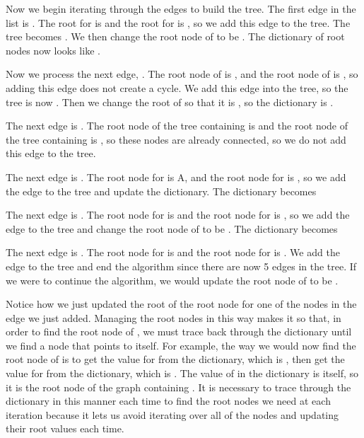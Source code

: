 Now we begin iterating through the edges to build the tree.
The first edge in the list is .
The root for  is  and the root for  is , so we add this edge to the tree.
The tree becomes \li{[(C, D, 1)]}.
We then change the root node of  to be .
The dictionary of root nodes now looks like .

Now we process the next edge, .
The root node of  is , and the root node of  is , so adding this edge does not create a cycle.
We add this edge into the tree, so the tree is now \li{[(C, D, 1), (C, E, 1)]}.
Then we change the root of  so that it is , so the dictionary is .

The next edge is .
The root node of the tree containing  is  and the root node of the tree containing  is , so these nodes are already connected, so we do not add this edge to the tree.

The next edge is .
The root node for  is A, and the root node for  is , so we add the edge to the tree and update the dictionary.
The dictionary becomes 

The next edge is .
The root node for  is  and the root node for  is , so we add the edge to the tree and change the root node of  to be .
The dictionary becomes 

The next edge is .
The root node for  is  and the root node for  is .
We add the edge to the tree and end the algorithm since there are now 5 edges in the tree.
If we were to continue the algorithm, we would update the root node of  to be .

Notice how we just updated the root of the root node for one of the nodes in the edge we just added.
Managing the root nodes in this way makes it so that, in order to find the root node of , we must trace back through the dictionary until we find a node that points to itself.
For example, the way we would now find the root node of  is to get the value for  from the dictionary, which is , then get the value for  from the dictionary, which is .
The value of  in the dictionary is itself, so it is the root node of the graph containing .
It is necessary to trace through the dictionary in this manner each time to find the root nodes we need at each iteration because it lets us avoid iterating over all of the nodes and updating their root values each time.

